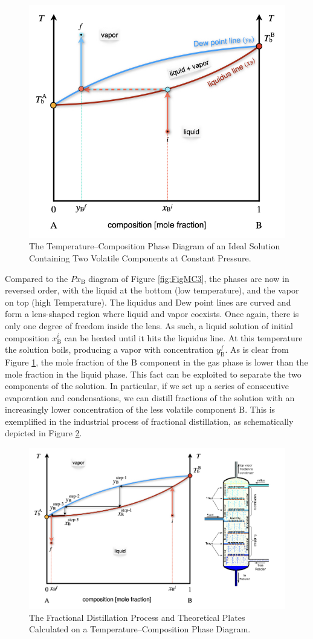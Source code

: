 \documentclass[
  9pt,
]{extbook}
\theoremstyle{definition}
\theoremstyle{definition}
\theoremstyle{definition}
\theoremstyle{remark}
\begin{document}
\begin{figure}

{\centering \includegraphics[width=0.6\linewidth]{./img/OEP_Figures.022} 

}

\caption{The Temperature–Composition Phase Diagram of an Ideal Solution Containing Two Volatile Components at Constant Pressure.}\label{fig:FigMC4}
\end{figure}

Compared to the \(Px_{\text{B}}\) diagram of Figure \ref{fig:FigMC3}, the phases are now in reversed order, with the liquid at the bottom (low temperature), and the vapor on top (high Temperature). The liquidus and Dew point lines are curved and form a lens-shaped region where liquid and vapor coexists. Once again, there is only one degree of freedom inside the lens. As such, a liquid solution of initial composition \(x_{\text{B}}^i\) can be heated until it hits the liquidus line. At this temperature the solution boils, producing a vapor with concentration \(y_{\text{B}}^f\). As is clear from Figure \ref{fig:FigMC4}, the mole fraction of the \(\text{B}\) component in the gas phase is lower than the mole fraction in the liquid phase. This fact can be exploited to separate the two components of the solution. In particular, if we set up a series of consecutive evaporation and condensations, we can distill fractions of the solution with an increasingly lower concentration of the less volatile component \(\text{B}\). This is exemplified in the industrial process of fractional distillation, as schematically depicted in Figure \ref{fig:FigMC5}.

\begin{figure}

{\centering \includegraphics[width=0.6\linewidth]{./img/OEP_Figures.023} 

}

\caption{The Fractional Distillation Process and Theoretical Plates Calculated on a Temperature–Composition Phase Diagram.}\label{fig:FigMC5}
\end{figure}
\end{document}
